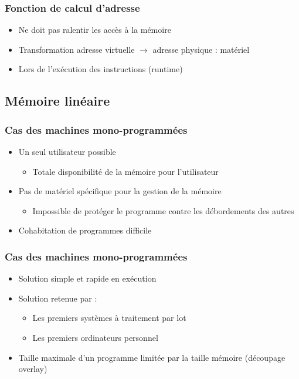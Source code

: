 \begin{frame}
\frametitle{Fonction de calcul d'adresse}
\begin{itemize}
\item Ne doit pas ralentir les accès à la mémoire
\item Transformation adresse virtuelle $\rightarrow$ adresse physique : matériel
\item Lors de l'exécution des instructions (runtime)
\end{itemize}
\end{frame}



\subsection{Mémoire linéaire}


\begin{frame}
\frametitle{Cas des machines mono-programmées}
\begin{itemize}
\item Un seul utilisateur possible
\begin{itemize}
\item Totale disponibilité de la mémoire pour l'utilisateur
\end{itemize}
\item Pas de matériel spécifique pour la gestion de la mémoire
\begin{itemize}
\item Impossible de protéger le programme contre les débordements des autres
\end{itemize}
\item Cohabitation de programmes difficile
\end{itemize}
\end{frame}


\begin{frame}
\frametitle{Cas des machines mono-programmées}
\begin{itemize}
\item Solution simple et rapide en exécution
\item Solution retenue par :
\begin{itemize}
\item Les premiers systèmes à traitement par lot
\item Les premiers ordinateurs personnel
\end{itemize}
\item Taille maximale d'un programme limitée par la taille mémoire (découpage overlay)
\end{itemize}
\end{frame}


